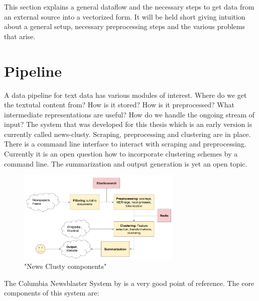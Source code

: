 
This section explains a general dataflow and the necessary steps to get data from an external source into a vectorized form. It will be held short giving intuition about a general setup, necessary preprocessing steps and the various problems that arise.

\section{Pipeline}
  A data pipeline for text data has various modules of interest. Where do we get the textutal content from? How is it stored? How is it preprocessed? What intermediate representations are useful? How do we handle the ongoing stream of input? The system that was developed for this thesis which is an early version is currently called news-clusty. Scraping, preprocessing and clustering are in place. There is a command line interface to interact with scraping and preprocessing. Currently it is an open question how to incorporate clustering schemes by a command line. The summarization and output generation is yet an open topic.

  \begin{figure}[h!]
    \centering
      \includegraphics[width=0.7\textwidth]{news_clusty.png}
      \caption{"News Clusty components"}
      \label{news_clusty}
  \end{figure}

  The Columbia Newsblaster System by \cite{ColumbiaMultiDoc2001} is a very good point of reference. The core components of this system are:

